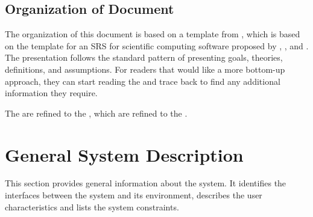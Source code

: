 \documentclass[12pt]{article}
\begin{document}
\subsection{Organization of Document}
The organization of this document is based on a template from
\cite{smith_captemplate_2022}, which is based on the template for an SRS for
scientific computing software proposed by \cite{SmithAndLai2005},
\cite{SmithEtAl2007}, and \cite{koothoor_document_2013}. The presentation
follows the standard pattern of presenting goals, theories, definitions, and
assumptions. For readers that would like a more bottom-up approach, they can
start reading the  and trace back to find any additional
information they require.

The  are refined to the , which are
refined to the .

\section{General System Description} \label{sec_genSysDesc}

This section provides general information about the system.  It identifies the
interfaces between the system and its environment, describes the user
characteristics and lists the system constraints.
\end{document}
